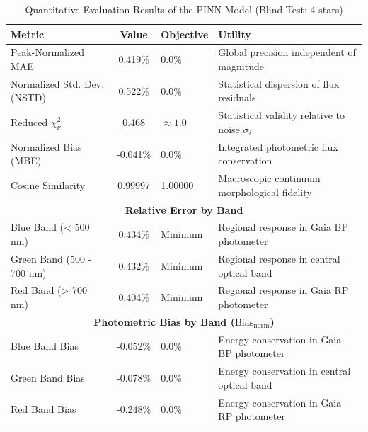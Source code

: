 
\begin{table}[htpb]
\centering
\caption{Quantitative Evaluation Results of the PINN Model (Blind Test: 4 stars)}
\label{tab:pinn_evaluation}
\begin{tabular}{lcll}
\hline
\textbf{Metric} & \textbf{Value} & \textbf{Objective} & \textbf{Utility} \\
\hline
Peak-Normalized MAE & 0.419\% & 0.0\% & Global precision independent of magnitude \\
Normalized Std. Dev. (NSTD) & 0.522\% & 0.0\% & Statistical dispersion of flux residuals \\
Reduced $\chi^2_\nu$ & 0.468 & $\approx 1.0$ & Statistical validity relative to noise $\sigma_i$ \\
Normalized Bias (MBE) & -0.041\% & 0.0\% & Integrated photometric flux conservation \\
Cosine Similarity & 0.99997 & 1.00000 & Macroscopic continuum morphological fidelity \\
\hline
\multicolumn{4}{c}{\textbf{Relative Error by Band}} \\
\hline
Blue Band (< 500 nm) & 0.434\% & Minimum & Regional response in Gaia BP photometer \\
Green Band (500 - 700 nm) & 0.432\% & Minimum & Regional response in central optical band \\
Red Band (> 700 nm) & 0.404\% & Minimum & Regional response in Gaia RP photometer \\
\hline
\multicolumn{4}{c}{\textbf{Photometric Bias by Band ($\text{Bias}_{\text{norm}}$)}} \\
\hline
Blue Band Bias & -0.052\% & 0.0\% & Energy conservation in Gaia BP photometer \\
Green Band Bias & -0.078\% & 0.0\% & Energy conservation in central optical band \\
Red Band Bias & -0.248\% & 0.0\% & Energy conservation in Gaia RP photometer \\
\hline
\end{tabular}
\end{table}
